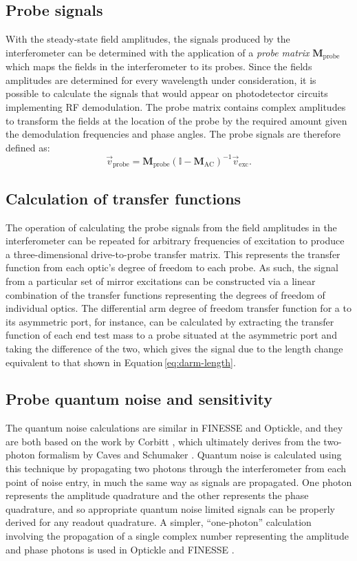 \subsection{Probe signals}
With the steady-state field amplitudes, the signals produced by the interferometer can be determined with the application of a \emph{probe matrix} $\mathbf{M}_{\text{probe}}$ which maps the fields in the interferometer to its probes. Since the fields amplitudes are determined for every wavelength under consideration, it is possible to calculate the signals that would appear on photodetector circuits implementing \gls{RF} demodulation. The probe matrix contains complex amplitudes to transform the fields at the location of the probe by the required amount given the demodulation frequencies and phase angles. The probe signals are therefore defined as:
\begin{equation}
  \vec{v}_{\text{probe}} = \mathbf{M}_{\text{probe}} \left( \mathbb{I} - \mathbf{M}_{\text{AC}} \right)^{-1} \vec{v}_{\text{exc}}.
\end{equation}

\subsection{Calculation of transfer functions}
The operation of calculating the probe signals from the field amplitudes in the interferometer can be repeated for arbitrary frequencies of excitation to produce a three-dimensional drive-to-probe transfer matrix. This represents the transfer function from each optic's degree of freedom to each probe. As such, the signal from a particular set of mirror excitations can be constructed via a linear combination of the transfer functions representing the degrees of freedom of individual optics. The differential arm degree of freedom transfer function for a \MI{} to its asymmetric port, for instance, can be calculated by extracting the transfer function of each end test mass to a probe situated at the asymmetric port and taking the difference of the two, which gives the signal due to the length change equivalent to that shown in Equation\,\ref{eq:darm-length}.

\subsection{Probe quantum noise and sensitivity}
The quantum noise calculations are similar in \gls{FINESSE} and Optickle, and they are both based on the work by Corbitt \etal{} \cite{Corbitt2005}, which ultimately derives from the two-photon formalism by Caves and Schumaker \cite{Caves1985, Schumaker1985}. Quantum noise is calculated using this technique by propagating two photons through the interferometer from each point of noise entry, in much the same way as signals are propagated. One photon represents the amplitude quadrature and the other represents the phase quadrature, and so appropriate quantum noise limited signals can be properly derived for any readout quadrature. A simpler, ``one-photon'' calculation involving the propagation of a single complex number representing the amplitude and phase photons is used in Optickle and \gls{FINESSE} \cite{Evans2013, Brown2016}.

